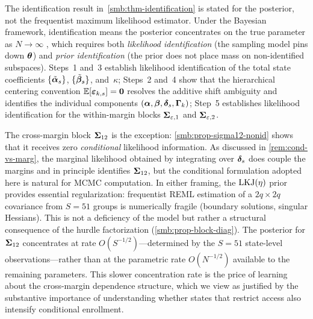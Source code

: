 
\begin{remark}\label{smb:rem-freq-vs-bayes}
  The identification result in~\cref{smb:thm-identification} is stated
  for the posterior, not the frequentist maximum likelihood estimator.
  Under the Bayesian framework, identification means the posterior
  concentrates on the true parameter as $N \to \infty$
  \citep[cf.~the Bernstein--von~Mises theorem under
  misspecification;][]{KleijnVanDerVaart2012}, which requires
  both \emph{likelihood identification} (the sampling model pins down
  $\boldsymbol{\theta}$) and \emph{prior identification} (the prior does not place
  mass on non-identified subspaces). Steps~1 and~3 establish
  likelihood identification of the total state coefficients
  $\{\tilde{\boldsymbol{\alpha}}_s\}$, $\{\tilde{\boldsymbol{\beta}}_s\}$, and~$\kappa$;
  Steps~2 and~4 show that the hierarchical centering convention
  $\mathbb{E}[\boldsymbol{\varepsilon}_{k,s}] = \mathbf{0}$ resolves the additive shift
  ambiguity and identifies the individual components
  $(\boldsymbol{\alpha}, \boldsymbol{\beta}, \boldsymbol{\delta}_s, \boldsymbol{\Gamma}_k)$;
  Step~5 establishes likelihood identification for the
  within-margin blocks $\boldsymbol{\Sigma}_{\varepsilon,1}$ and
  $\boldsymbol{\Sigma}_{\varepsilon,2}$.

  The cross-margin block $\boldsymbol{\Sigma}_{12}$ is the exception:
  \cref{smb:prop-sigma12-nonid} shows that it receives zero
  \emph{conditional} likelihood information. As discussed in
  \cref{rem:cond-vs-marg}, the marginal likelihood obtained by
  integrating over $\boldsymbol{\delta}_s$ does couple the margins and in principle
  identifies $\boldsymbol{\Sigma}_{12}$, but the conditional formulation adopted
  here is natural for MCMC computation.  In either framing, the
  $\operatorname{LKJ}(\eta)$ prior provides essential regularization: frequentist
  REML estimation of a $2q \times 2q$ covariance from $S = 51$ groups
  is numerically fragile (boundary solutions, singular Hessians).
  This is not a deficiency of the model but rather a structural
  consequence of the hurdle factorization
  (\cref{smb:prop-block-diag}). The posterior for $\boldsymbol{\Sigma}_{12}$
  concentrates at rate $O(S^{-1/2})$---determined by the $S = 51$
  state-level observations---rather than at the parametric rate
  $O(N^{-1/2})$ available to the remaining parameters. This slower
  concentration rate is the price of learning about the cross-margin
  dependence structure, which we view as justified by the substantive
  importance of understanding whether states that restrict access also
  intensify conditional enrollment.
\end{remark}
